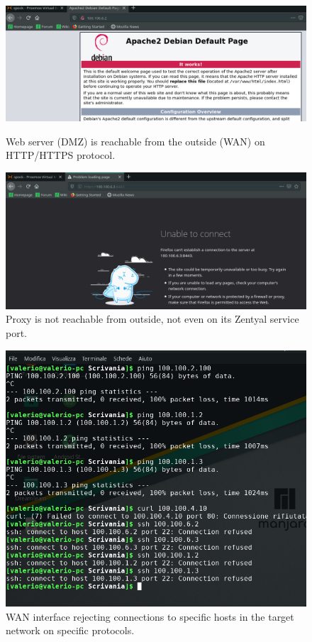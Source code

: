 \begin{figure}[H]
\centering
\begin{minipage}{.5\textwidth}
  \centering
  \includegraphics[width=1\textwidth]{web_reachableHTTP.png}
  \caption[a]{Web server (DMZ) is reachable from the outside (WAN) on HTTP/HTTPS protocol.}\label{fig:9}
\end{minipage}%
\begin{minipage}{.5\textwidth}
  \centering
  \includegraphics[width=1\textwidth]{firewallShieldingProxyZentyal.png}
  \caption[a]{Proxy is not reachable from outside, not even on its Zentyal service port.}\label{fig:10}
\end{minipage}
\end{figure}

\begin{figure}[H]
\centering
  \includegraphics[width=1\textwidth]{WANRefusingUndesiredConnections.png}
  \caption[a]{WAN interface rejecting connections to specific hosts in the target network on specific protocols.}\label{fig:11}
\end{figure}

